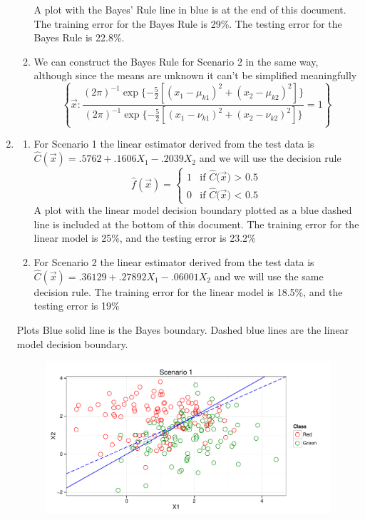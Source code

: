 \documentclass{article}
\begin{document}
\begin{enumerate}
\begin{enumerate}
           A plot with the Bayes' Rule line in blue is at the end of this document. The training error for the Bayes Rule is 29\%. 
           The testing error for the Bayes Rule is 22.8\%. 
        \item We can construct the Bayes Rule for Scenario 2 in the same way, although since the means are unknown it can't be simplified meaningfully
          $$ \left\{\vec{x}:\frac{(2\pi)^{-1}\exp\{-\frac{5}{2}[(x_1-\mu_{k1})^2+(x_2-\mu_{k2})^2]\}}{(2\pi)^{-1}\exp\{-\frac{5}{2}[(x_1-\nu_{k1})^2+(x_2-\nu_{k2})^2]\}} = 1 \right\}$$
      \end{enumerate}
    \item 
      \begin{enumerate}
        \item For Scenario 1 the linear estimator derived from the test data is $\hat{C}(\vec{x}) = .5762 + .1606X_1 -.2039X_2$ and we will
        use the decision rule
        $$ \hat{f}(\vec{x}) = \left\{\begin{array}{ll}
                                        1 & \mbox{if $\hat{C}(\vec{x}$) > 0.5} \\
                                        0 & \mbox{if $\hat{C}(\vec{x}$) < 0.5}
                                    \end{array}\right.$$
       A plot with the linear model decision boundary plotted as a blue dashed line is included at the bottom of this document. The training error for the linear model 
       is 25\%, and the testing error is 23.2\% 
        \item For Scenario 2 the linear estimator derived from the test data is $\hat{C}(\vec{x}) = .36129 + .27892X_1 -.06001X_2$ and we will use the same decision rule. 
        The training error for the linear model is 18.5\%, and the testing error is 19\% 
      \end{enumerate}\newpage
    \item[Plots] Blue solid line is the Bayes boundary. Dashed blue lines are the linear model decision boundary. 
\begin{figure}[h]
\begin{center}
\includegraphics{Homework1-002}

\end{center}
\end{figure}
\end{enumerate}
\end{document}
